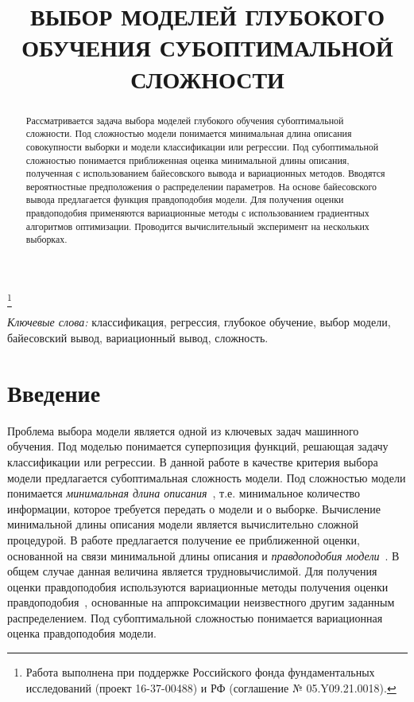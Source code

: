\documentclass[12pt]{a&t}
\begin{document}
\title{ВЫБОР МОДЕЛЕЙ ГЛУБОКОГО ОБУЧЕНИЯ СУБОПТИМАЛЬНОЙ СЛОЖНОСТИ}
\thanks{Работа выполнена при поддержке Российского фонда фундаментальных исследований (проект 16-37-00488) и РФ (соглашение № 05.Y09.21.0018).}

\maketitle




\begin{abstract}Рассматривается задача выбора моделей глубокого обучения субоптимальной сложности. Под сложностью модели понимается минимальная длина описания совокупности выборки и модели классификации или регрессии. Под субоптимальной сложностью понимается приближенная оценка минимальной длины описания, полученная с использованием байесовского вывода и вариационных методов. Вводятся вероятностные предположения о распределении параметров. На основе байесовского вывода предлагается функция правдоподобия модели. Для получения оценки правдоподобия применяются вариационные методы с использованием градиентных алгоритмов оптимизации. Проводится вычислительный эксперимент на нескольких выборках.
\end{abstract}

\textit{Ключевые слова:} классификация, регрессия, глубокое обучение, выбор модели, байесовский вывод, вариационный вывод, сложность.
\section{Введение}

Проблема выбора модели является одной из ключевых задач машинного обучения. Под моделью понимается суперпозиция функций, решающая задачу классификации или регрессии.
В данной работе в качестве критерия выбора модели предлагается субоптимальная сложность модели. Под сложностью модели понимается \emph{минимальная длина описания}~\cite{mdl}, т.е. минимальное количество информации, которое требуется передать о модели и о выборке. Вычисление минимальной длины описания модели является вычислительно сложной процедурой. В работе предлагается получение ее приближенной оценки, основанной на связи минимальной длины описания и \emph{правдоподобия модели}~\cite{mdl}. {В общем случае данная величина является трудновычислимой.} Для получения оценки правдоподобия используются вариационные методы получения оценки правдоподобия~\cite{Bishop}, основанные на аппроксимации неизвестного другим заданным распределением. Под субоптимальной сложностью понимается вариационная оценка правдоподобия модели.
\end{document}

